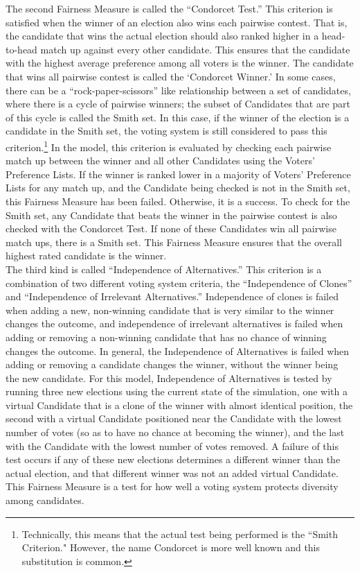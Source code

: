 \documentclass[12pt]{article}
\begin{document}
\qquad The second Fairness Measure is called the ``Condorcet Test.'' This criterion is satisfied when the winner of an election also wins each pairwise contest. That is, the candidate that wins the actual election should also ranked higher in a head-to-head match up against every other candidate. This ensures that the candidate with the highest average preference among all voters is the winner. The candidate that wins all pairwise contest is called the `Condorcet Winner.' In some cases, there can be a ``rock-paper-scissors'' like relationship between a set of candidates, where there is a cycle of pairwise winners; the subset of Candidates that are part of this cycle is called the Smith set. In this case, if the winner of the election is a candidate in the Smith set, the voting system is still considered to pass this criterion.\footnote{Technically, this means that the actual test being performed is the ``Smith Criterion." However, the name Condorcet is more well known and this substitution is common.} In the model, this criterion is evaluated by checking each pairwise match up between the winner and all other Candidates using the Voters' Preference Lists. If the winner is ranked lower in a majority of Voters' Preference Lists for any match up, and the Candidate being checked is not in the Smith set, this Fairness Measure has been failed. Otherwise, it is a success. To check for the Smith set, any Candidate that beats the winner in the pairwise contest is also checked with the Condorcet Test. If none of these Candidates win all pairwise match ups, there is a Smith set. This Fairness Measure ensures that the overall highest rated candidate is the winner. \\

\qquad The third kind is called ``Independence of Alternatives.'' This criterion is a combination of two different voting system criteria, the ``Independence of Clones'' and ``Independence of Irrelevant Alternatives.'' Independence of clones is failed when adding a new, non-winning candidate that is very similar to the winner changes the outcome, and independence of irrelevant alternatives is failed when adding or removing a non-winning candidate that has no chance of winning changes the outcome. In general, the Independence of Alternatives is failed when adding or removing a candidate changes the winner, without the winner being the new candidate. For this model, Independence of Alternatives is tested by running three new elections using the current state of the simulation, one with a virtual Candidate that is a clone of the winner with almost identical position, the second with a virtual Candidate positioned near the Candidate with the lowest number of votes (so as to have no chance at becoming the winner), and the last with the Candidate with the lowest number of votes removed. A failure of this test occurs if any of these new elections determines a different winner than the actual election, and that different winner was not an added virtual Candidate. This Fairness Measure is a test for how well a voting system protects diversity among candidates. \\
\end{document}
